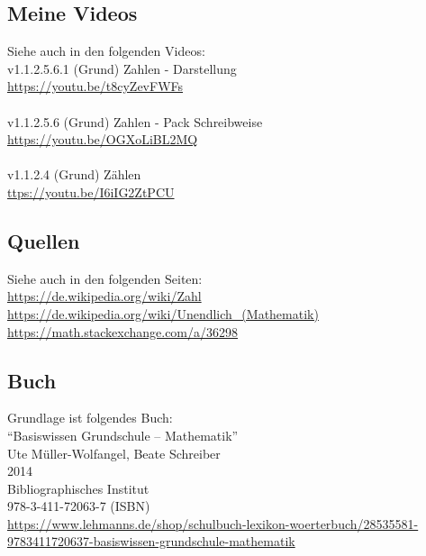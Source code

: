 \documentclass[a4paper]{amsart}
\theoremstyle{definition}
\begin{document}
\subsection*{Meine Videos}
Siehe auch in den folgenden Videos:\\
v1.1.2.5.6.1 (Grund) Zahlen - Darstellung\\
\url{https://youtu.be/t8cyZevFWFs}\\
\\
v1.1.2.5.6 (Grund) Zahlen - Pack Schreibweise\\
\url{https://youtu.be/OGXoLiBL2MQ}\\
\\
v1.1.2.4 (Grund) Zählen\\
\url{ttps://youtu.be/I6iIG2ZtPCU}\\

\subsection*{Quellen}
Siehe auch in den folgenden Seiten:\\
\url{https://de.wikipedia.org/wiki/Zahl}\\
\url{https://de.wikipedia.org/wiki/Unendlich_(Mathematik)}\\
\url{https://math.stackexchange.com/a/36298}

\subsection*{Buch}
Grundlage ist folgendes Buch:\\
"`Basiswissen Grundschule – Mathematik"'\\
Ute Müller-Wolfangel, Beate Schreiber\\
2014\\
Bibliographisches Institut\\
978-3-411-72063-7 (ISBN)
\\
{\tiny\url{https://www.lehmanns.de/shop/schulbuch-lexikon-woerterbuch/28535581-9783411720637-basiswissen-grundschule-mathematik}}
\end{document}
